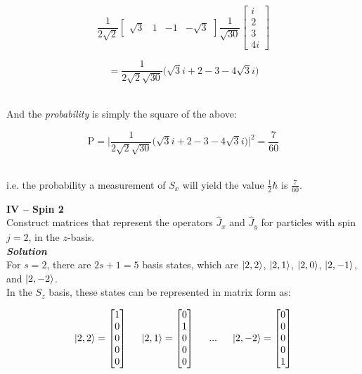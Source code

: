 \documentclass[9pt]{extarticle}
\newcommand{\bfit}[1]{\textbf{\textit{#1}}}
\begin{document}
\begin{multicols*}{2}
$$
\frac{1}{2\sqrt 2}
\begin{bmatrix}
	\sqrt 3 & 1 & -1 & -\sqrt 3
\end{bmatrix}
\frac{1}{\sqrt{30}}
\begin{bmatrix}
        i \\
        2 \\
        3 \\
        4i
\end{bmatrix}
$$

$$= \frac{1}{2 \sqrt 2 \sqrt{30}} \bigg( \sqrt 3 i + 2 - 3 - 4\sqrt 3 i \bigg)$$ \ 

And the {\it probability} is simply the square of the above:

$$\text{P} = \Bigg| \frac{1}{2 \sqrt 2 \sqrt{30}} \bigg( \sqrt 3 i + 2 - 3 - 4\sqrt 3 i \bigg) \Bigg|^2 = \frac{7}{60}$$ \ 

i.e. the probability a measurement of $S_x$ will yield the value $\frac 12 \hbar$ is $\frac{7}{60}$. \\ 





\hrulefill 

\hfill 

{\bf \LARGE IV -- Spin 2} \\ 

Construct matrices that represent the operators $\hat J_x$ and $\hat J_y$ for particles with spin $j = 2$, in the $z$-basis. \\ 

{\bfit{Solution}} \\ 
For $s = 2$, there are $2s+1 = 5$ basis states, which are $\ket{2,2}$, $\ket{2,1}$, $\ket{2,0}$, $\ket{2,-1}$, and $\ket{2,-2}$. \\ 

In the $S_z$ basis, these states can be represented in matrix form as:

$$
\ket{2,2} = 
\begin{bmatrix}
	1 \\ 0 \\ 0 \\ 0 \\ 0
\end{bmatrix}
\hspace{0.5cm}
\ket{2,1} = 
\begin{bmatrix}
        0 \\ 1 \\ 0 \\ 0 \\ 0
\end{bmatrix}
\hspace{0.5cm}
...
\hspace{0.5cm}
\ket{2,-2} = 
\begin{bmatrix}
        0 \\ 0 \\ 0 \\ 0 \\ 1
\end{bmatrix}
$$ \ 


\end{multicols*}
\end{document}
